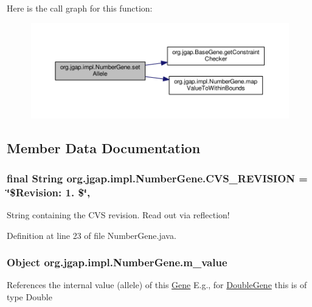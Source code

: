 Here is the call graph for this function\-:
\nopagebreak
\begin{figure}[H]
\begin{center}
\leavevmode
\includegraphics[width=350pt]{classorg_1_1jgap_1_1impl_1_1_number_gene_a694c7472b269b500d40eca6966e21291_cgraph}
\end{center}
\end{figure}




\subsection{Member Data Documentation}
\hypertarget{classorg_1_1jgap_1_1impl_1_1_number_gene_a02c4c0f2278e7fc5119beef02806271f}{
\subsubsection[{C\-V\-S\-\_\-\-R\-E\-V\-I\-S\-I\-O\-N}]{\setlength{\rightskip}{0pt plus 5cm}final String org.\-jgap.\-impl.\-Number\-Gene.\-C\-V\-S\-\_\-\-R\-E\-V\-I\-S\-I\-O\-N = \char`\"{}\$Revision\-: 1. \$\char`\"{}\hspace{0.3cm}{\ttfamily [static]}, {\ttfamily [private]}}}\label{classorg_1_1jgap_1_1impl_1_1_number_gene_a02c4c0f2278e7fc5119beef02806271f}
String containing the C\-V\-S revision. Read out via reflection! 

Definition at line 23 of file Number\-Gene.\-java.

\hypertarget{classorg_1_1jgap_1_1impl_1_1_number_gene_aa8ff97bc401fc5729f2164d91c8c080f}{
\subsubsection[{m\-\_\-value}]{\setlength{\rightskip}{0pt plus 5cm}Object org.\-jgap.\-impl.\-Number\-Gene.\-m\-\_\-value\hspace{0.3cm}{\ttfamily [private]}}}\label{classorg_1_1jgap_1_1impl_1_1_number_gene_aa8ff97bc401fc5729f2164d91c8c080f}
References the internal value (allele) of this \hyperlink{interfaceorg_1_1jgap_1_1_gene}{Gene} E.\-g., for \hyperlink{classorg_1_1jgap_1_1impl_1_1_double_gene}{Double\-Gene} this is of type Double 

